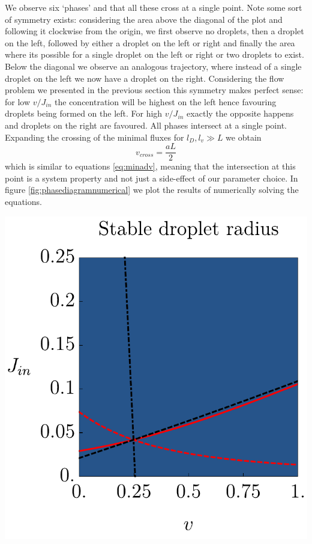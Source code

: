 \documentclass{Dissertate}
\let\origfigure\figure
\let\endorigfigure\endfigure
\renewenvironment{figure}[1][2] {
    \expandafter\origfigure\expandafter[H]
} {
    \endorigfigure
}
\begin{document}
We observe six `phases' and that all these cross at a single point. Note
some sort of symmetry exists: considering the area above the diagonal of
the plot and following it clockwise from the origin, we first observe no
droplets, then a droplet on the left, followed by either a droplet on
the left or right and finally the area where its possible for a single
droplet on the left or right or two droplets to exist. Below the
diagonal we observe an analogous trajectory, where instead of a single
droplet on the left we now have a droplet on the right. Considering the
flow problem we presented in the previous section this symmetry makes
perfect sense: for low \(v/J_{in}\) the concentration will be highest on
the left hence favouring droplets being formed on the left. For high
\(v/J_{in}\) exactly the opposite happens and droplets on the right are
favoured. All phases intersect at a single point. Expanding the crossing
of the minimal fluxes for \(l_D,l_v\gg L\) we obtain \[
v_{cross}=\frac{aL}{2}
\] which is similar to equations \ref{eq:minadv}, meaning that the
intersection at this point is a system property and not just a
side-effect of our parameter choice. In figure
\ref{fig:phasediagramnumerical} we plot the results of numerically
solving the equations.

\begin{figure}
\hypertarget{fig:phasediagramnumerical}{%
\centering
\includegraphics{source/figures/pdf/Numericalphase.pdf}
\caption{Caption.}\label{fig:phasediagramnumerical}
}
\end{figure}
\end{document}
